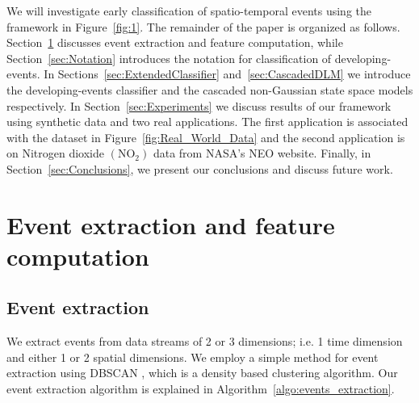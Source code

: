\documentclass[a4paper,11pt]{article}
\begin{document}
We will investigate early classification of spatio-temporal events using the framework in Figure~\ref{fig:1}. The remainder of the paper is organized as follows. Section~\ref{sec:EventExtract} discusses event extraction and feature computation, while Section~\ref{sec:Notation} introduces the notation for classification of developing-events. In Sections~\ref{sec:ExtendedClassifier} and~\ref{sec:CascadedDLM} we introduce the developing-events classifier and the cascaded non-Gaussian state space models respectively. %
In Section~\ref{sec:Experiments} we discuss results of our framework using synthetic data and two real applications. The first application is associated with the dataset in Figure~\ref{fig:Real_World_Data} and the second application is on Nitrogen dioxide $(\text{NO}_2)$ data from NASA's NEO \cite{OMINO2} website. Finally, in Section~\ref{sec:Conclusions}, we present our conclusions and discuss future work.

\section{Event extraction and feature computation} \label{sec:EventExtract}

\subsection{Event extraction}

We extract events from data streams of 2 or 3 dimensions; i.e. 1 time dimension and either 1 or 2 spatial dimensions. We employ a simple method for event extraction using DBSCAN \cite{ester1996density}, which is a density based clustering algorithm. Our event extraction algorithm is explained in Algorithm~\ref{algo:events_extraction}.
\end{document}
